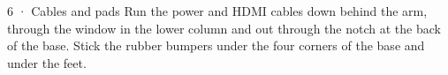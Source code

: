 \begin{step}{6 · Cables and pads}
Run the power and HDMI cables down behind the arm, through the window in the lower column and out through the notch
at the back of the base. Stick the rubber bumpers under the four corners of the base and under the feet.
\end{step}
